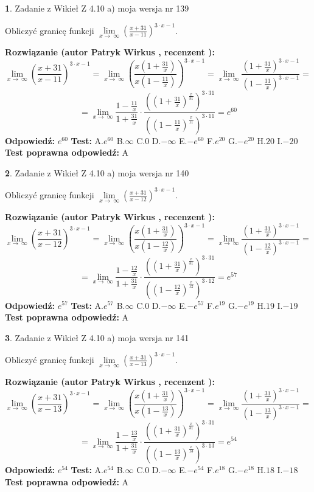 \documentclass[12pt, a4paper]{article}
\theoremstyle{definition} %
\newtheorem{zad}{}
\newcommand{\zadStart}[1]{\begin{zad}#1\newline}
\newcommand{\zadStop}{\end{zad}}
\newcommand{\rozwStart}[2]{\noindent \textbf{Rozwiązanie (autor #1 , recenzent #2): }\newline}
\newcommand{\rozwStop}{\newline}
\newcommand{\odpStart}{\noindent \textbf{Odpowiedź:}\newline}
\newcommand{\odpStop}{\newline}
\newcommand{\testStart}{\noindent \textbf{Test:}\newline}
\newcommand{\testStop}{\newline}
\newcommand{\kluczStart}{\noindent \textbf{Test poprawna odpowiedź:}\newline}
\newcommand{\kluczStop}{\newline}
\begin{document}
\zadStart{Zadanie z Wikieł Z 4.10 a) moja wersja nr 139}

Obliczyć granicę funkcji  $\lim\limits_{x\to\ \infty}(\frac{x+31}{x-11})^{3\cdot x-1}$.
\zadStop
\rozwStart{Patryk Wirkus}{}
$$\lim\limits_{x\to\ \infty}(\frac{x+31}{x-11})^{3\cdot x-1} = \lim\limits_{x\to\ \infty}(\frac{x(1+\frac{31}{x})}{x(1-\frac{11}{x})})^{3\cdot x-1}=\lim\limits_{x\to\ \infty}\frac{(1+\frac{31}{x})^{3\cdot x-1}}{(1-\frac{11}{x})^{3\cdot x-1}}=$$
$$=\lim\limits_{x\to\ \infty}\frac{1-\frac{11}{x}}{1+\frac{31}{x}}\cdot\frac{((1+\frac{31}{x})^{\frac{x}{31}})^{3\cdot31}}{((1-\frac{11}{x})^{\frac{x}{11}})^{3\cdot11}}=e^{60}$$
\rozwStop
\odpStart
$e^{60}$
\odpStop
\testStart
A.$e^{60}$ B.$\infty$ C.$0$ D.$-\infty$ E.$-e^{60}$
F.$e^{20}$ G.$-e^{20}$
H.$20$
I.$-20$
\testStop
\kluczStart
A
\kluczStop



\zadStart{Zadanie z Wikieł Z 4.10 a) moja wersja nr 140}

Obliczyć granicę funkcji  $\lim\limits_{x\to\ \infty}(\frac{x+31}{x-12})^{3\cdot x-1}$.
\zadStop
\rozwStart{Patryk Wirkus}{}
$$\lim\limits_{x\to\ \infty}(\frac{x+31}{x-12})^{3\cdot x-1} = \lim\limits_{x\to\ \infty}(\frac{x(1+\frac{31}{x})}{x(1-\frac{12}{x})})^{3\cdot x-1}=\lim\limits_{x\to\ \infty}\frac{(1+\frac{31}{x})^{3\cdot x-1}}{(1-\frac{12}{x})^{3\cdot x-1}}=$$
$$=\lim\limits_{x\to\ \infty}\frac{1-\frac{12}{x}}{1+\frac{31}{x}}\cdot\frac{((1+\frac{31}{x})^{\frac{x}{31}})^{3\cdot31}}{((1-\frac{12}{x})^{\frac{x}{12}})^{3\cdot12}}=e^{57}$$
\rozwStop
\odpStart
$e^{57}$
\odpStop
\testStart
A.$e^{57}$ B.$\infty$ C.$0$ D.$-\infty$ E.$-e^{57}$
F.$e^{19}$ G.$-e^{19}$
H.$19$
I.$-19$
\testStop
\kluczStart
A
\kluczStop



\zadStart{Zadanie z Wikieł Z 4.10 a) moja wersja nr 141}

Obliczyć granicę funkcji  $\lim\limits_{x\to\ \infty}(\frac{x+31}{x-13})^{3\cdot x-1}$.
\zadStop
\rozwStart{Patryk Wirkus}{}
$$\lim\limits_{x\to\ \infty}(\frac{x+31}{x-13})^{3\cdot x-1} = \lim\limits_{x\to\ \infty}(\frac{x(1+\frac{31}{x})}{x(1-\frac{13}{x})})^{3\cdot x-1}=\lim\limits_{x\to\ \infty}\frac{(1+\frac{31}{x})^{3\cdot x-1}}{(1-\frac{13}{x})^{3\cdot x-1}}=$$
$$=\lim\limits_{x\to\ \infty}\frac{1-\frac{13}{x}}{1+\frac{31}{x}}\cdot\frac{((1+\frac{31}{x})^{\frac{x}{31}})^{3\cdot31}}{((1-\frac{13}{x})^{\frac{x}{13}})^{3\cdot13}}=e^{54}$$
\rozwStop
\odpStart
$e^{54}$
\odpStop
\testStart
A.$e^{54}$ B.$\infty$ C.$0$ D.$-\infty$ E.$-e^{54}$
F.$e^{18}$ G.$-e^{18}$
H.$18$
I.$-18$
\testStop
\kluczStart
A
\kluczStop
\end{document}
